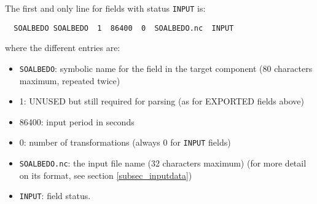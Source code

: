 The first and only line for fields with status {\tt INPUT} is:

  \begin{verbatim}
  SOALBEDO SOALBEDO  1  86400  0  SOALBEDO.nc  INPUT
  \end{verbatim}
\vspace{-0.5cm}
where the different entries are:
\begin{itemize}
\item {\tt SOALBEDO}: symbolic name for the field in the target component
  (80 characters maximum, repeated twice)
\item 1: UNUSED but still required for parsing (as for
  EXPORTED fields above)
\item 86400: input period in seconds
\item 0: number of transformations (always 0 for {\tt INPUT} fields)
\item {\tt SOALBEDO.nc}:  the input file name (32 characters maximum)
  (for more detail on its format, see section \ref{subsec_inputdata})
\item {\tt INPUT}: field status.
\end{itemize}

